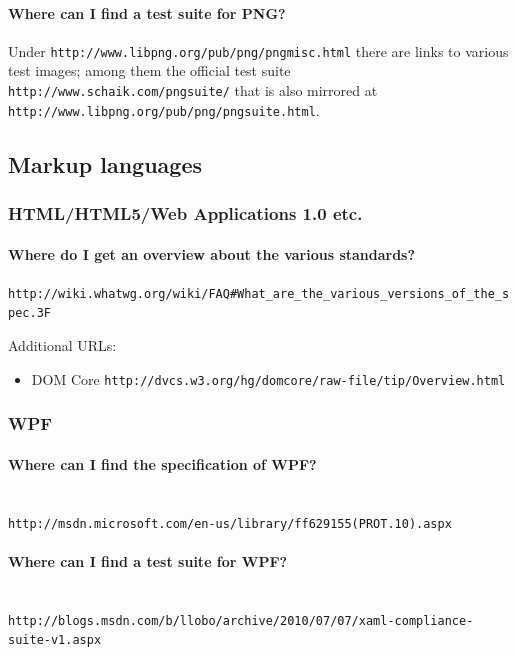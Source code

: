 \documentclass[10pt]{scrbook}
\begin{document}
\paragraph{Where can I find a test suite for PNG?}

Under \verb|http://www.libpng.org/pub/png/pngmisc.html| there are links to various test images; among them the official test suite \verb|http://www.schaik.com/pngsuite/| that is also mirrored at \verb|http://www.libpng.org/pub/png/pngsuite.html|.

\subsection{Markup languages}

\subsubsection{HTML/HTML5/Web Applications 1.0 etc.}

\paragraph{Where do I get an overview about the various standards?}

\verb|http://wiki.whatwg.org/wiki/FAQ#What_are_the_various_versions_of_the_spec.3F|

Additional URLs:
\begin{itemize}
\item DOM Core \verb|http://dvcs.w3.org/hg/domcore/raw-file/tip/Overview.html|
\end{itemize}

\subsubsection{WPF}

\paragraph{Where can I find the specification of WPF?} ~ \\
\verb|http://msdn.microsoft.com/en-us/library/ff629155(PROT.10).aspx|

\paragraph{Where can I find a test suite for WPF?} ~ \\
\verb|http://blogs.msdn.com/b/llobo/archive/2010/07/07/xaml-compliance-suite-v1.aspx|
\end{document}
